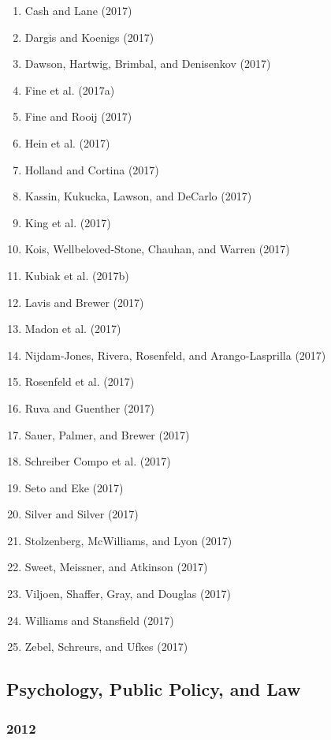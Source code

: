 \documentclass[english,man]{apa6}
\providecommand{\tightlist}{%
  \setlength{\itemsep}{0pt}\setlength{\parskip}{0pt}}
\begin{document}
\begin{enumerate}
\def\labelenumi{\arabic{enumi})}
\tightlist
\item
  Cash and Lane (2017)
\item
  Dargis and Koenigs (2017)
\item
  Dawson, Hartwig, Brimbal, and Denisenkov (2017)
\item
  Fine et al. (2017a)
\item
  Fine and Rooij (2017)
\item
  Hein et al. (2017)
\item
  Holland and Cortina (2017)
\item
  Kassin, Kukucka, Lawson, and DeCarlo (2017)
\item
  King et al. (2017)
\item
  Kois, Wellbeloved-Stone, Chauhan, and Warren (2017)
\item
  Kubiak et al. (2017b)
\item
  Lavis and Brewer (2017)
\item
  Madon et al. (2017)
\item
  Nijdam-Jones, Rivera, Rosenfeld, and Arango-Lasprilla (2017)
\item
  Rosenfeld et al. (2017)
\item
  Ruva and Guenther (2017)
\item
  Sauer, Palmer, and Brewer (2017)
\item
  Schreiber Compo et al. (2017)
\item
  Seto and Eke (2017)
\item
  Silver and Silver (2017)
\item
  Stolzenberg, McWilliams, and Lyon (2017)
\item
  Sweet, Meissner, and Atkinson (2017)
\item
  Viljoen, Shaffer, Gray, and Douglas (2017)
\item
  Williams and Stansfield (2017)
\item
  Zebel, Schreurs, and Ufkes (2017)
\end{enumerate}

\subsection{Psychology, Public Policy, and
Law}\label{psychology-public-policy-and-law}

\subsubsection{2012}\label{section-26}
\end{document}
